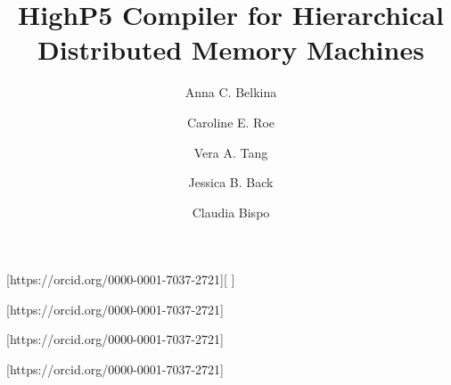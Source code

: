 \documentclass[ASNA,twocolumn]{USG} %
\begin{document}
\title{HighP5 Compiler for Hierarchical Distributed Memory Machines}
\author[1]{Anna C. Belkina}[https://orcid.org/0000-0001-7037-2721][  ]
\author[2]{Caroline E. Roe}
\author[3]{Vera A. Tang}[https://orcid.org/0000-0001-7037-2721]
\author[4]{Jessica B. Back}[https://orcid.org/0000-0001-7037-2721]
\author[2]{Claudia Bispo}[https://orcid.org/0000-0001-7037-2721]


















\end{document}
